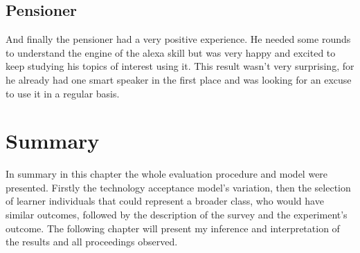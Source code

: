 \subsection{Pensioner}
And finally the pensioner had a very positive experience. He needed some rounds to understand the engine
of the alexa skill but was very happy and excited to keep studying his topics of interest using it.
This result wasn't very surprising, for he already had one smart speaker in the first place and was 
looking for an excuse to use it in a regular basis.



\section{Summary}
In summary in this chapter the whole evaluation procedure and model were presented. Firstly the 
technology acceptance model's variation, then the selection of learner individuals that could represent
a broader class, who would have similar outcomes, followed by the description of the survey and the
experiment's outcome. The following chapter will present my inference and interpretation of the results
and all proceedings observed.